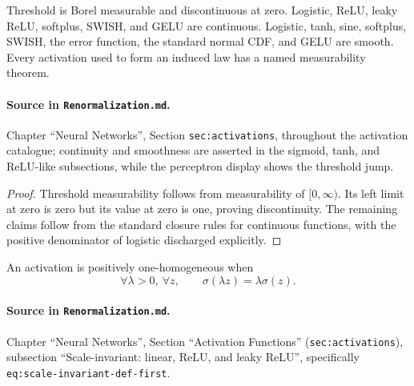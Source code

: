 \begin{lemma}
\label{lem:renorm:activationRegularity}
Threshold is Borel measurable and discontinuous at zero.  Logistic, ReLU, leaky ReLU, softplus,
SWISH, and GELU are continuous.  Logistic, tanh, sine, softplus, SWISH, the error function, the
standard normal CDF, and GELU are smooth.  Every activation used to form an induced law has a named
measurability theorem.

\paragraph{Source in \texttt{Renormalization.md}.}
Chapter ``Neural Networks'', Section \texttt{sec:activations}, throughout the activation catalogue;
continuity and smoothness are asserted in the sigmoid, tanh, and ReLU-like subsections, while the
perceptron display shows the threshold jump.
\end{lemma}

\begin{proof}
Threshold measurability follows from measurability of $[0,\infty)$.  Its left limit at zero is zero
but its value at zero is one, proving discontinuity.  The remaining claims follow from the standard
closure rules for continuous functions, with the positive denominator of logistic discharged
explicitly.
\end{proof}

\begin{definition}
\label{def:renorm:posHomogeneous}
An activation is positively one-homogeneous when
\[
  \forall \lambda>0,\ \forall z,\qquad \sigma(\lambda z)=\lambda\sigma(z).
\]

\paragraph{Source in \texttt{Renormalization.md}.}
Chapter ``Neural Networks'', Section ``Activation Functions'' (\texttt{sec:activations}), subsection
``Scale-invariant: linear, ReLU, and leaky ReLU'', specifically
\texttt{eq:scale-invariant-def-first}.
\end{definition}

